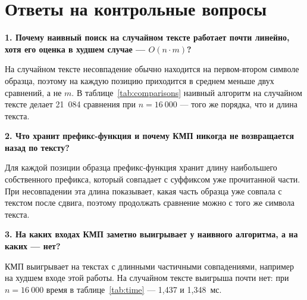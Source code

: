 \section{Ответы на контрольные вопросы}
\textbf{1. Почему наивный поиск на случайном тексте работает почти линейно, хотя его оценка
в худшем случае — $O(n \cdot m)$?}

На случайном тексте несовпадение обычно находится на первом-втором символе образца, поэтому
на каждую позицию приходится в среднем меньше двух сравнений, а не $m$. В
таблице~\ref{tab:comparisons} наивный алгоритм на случайном тексте делает 21~084 сравнения
при $n = 16~000$ — того же порядка, что и длина текста.

\textbf{2. Что хранит префикс-функция и почему КМП никогда не возвращается назад по тексту?}

Для каждой позиции образца префикс-функция хранит длину наибольшего собственного префикса,
который совпадает с суффиксом уже прочитанной части. При несовпадении эта длина показывает,
какая часть образца уже совпала с текстом после сдвига, поэтому продолжать сравнение можно с
того же символа текста.

\textbf{3. На каких входах КМП заметно выигрывает у наивного алгоритма, а на каких — нет?}

КМП выигрывает на текстах с длинными частичными совпадениями, например на худшем входе этой
работы. На случайном тексте выигрыша почти нет: при $n = 16~000$ время в
таблице~\ref{tab:time} — 1,437 и 1,348~мс.
